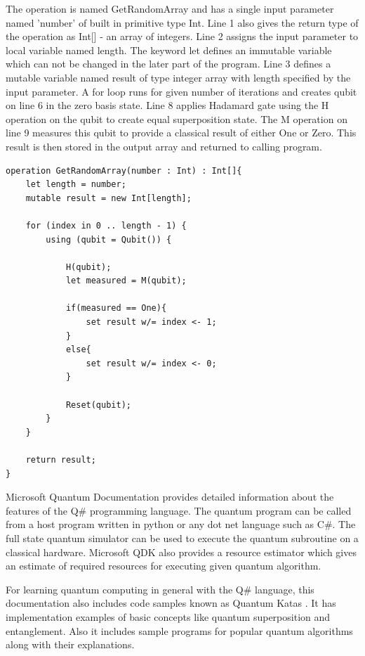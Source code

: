 \documentclass[english,a4paper,11pt,oneside,onecolumn]{book}
\begin{document}
The operation is named GetRandomArray and has a single input parameter named 'number' of built in primitive type Int.  Line 1 also gives the return type of the operation as Int[] - an array of integers. Line 2 assigns the input parameter to local variable named length. The keyword let defines an immutable variable which can not be changed in the later part of the program. Line 3 defines a mutable variable named result of type integer array with length specified by the input parameter. A for loop runs for given number of iterations and creates qubit on line 6 in the zero basis state. Line 8 applies Hadamard gate using the H operation on the qubit to create equal superposition state. The M operation on line 9 measures this qubit to provide a classical result of either One or Zero. This result is then stored in the output array and returned to calling program.

\begin{lstlisting}[caption={Example of Q\# Operation}]
operation GetRandomArray(number : Int) : Int[]{
    let length = number;
    mutable result = new Int[length];

    for (index in 0 .. length - 1) {
        using (qubit = Qubit()) {
            
            H(qubit);
            let measured = M(qubit);
            
            if(measured == One){
                set result w/= index <- 1;
            }
            else{
                set result w/= index <- 0;
            }

            Reset(qubit);
        }
    }
    
    return result;
}
\end{lstlisting}
\BlankLine

Microsoft Quantum Documentation provides detailed information about the features of the Q\# programming language. The quantum program can be called from a host program written in python or any dot net language such as C\#. The full state quantum simulator can be used to execute the quantum subroutine on a classical hardware. Microsoft QDK also provides a resource estimator which gives an estimate of required resources for executing given quantum algorithm.

For learning quantum computing in general with the Q\# language, this documentation also includes code samples known as Quantum Katas \cite{mykhailova_2020_microsoftquantumkatas}. It has implementation examples of basic concepts like quantum superposition and entanglement. Also it includes sample programs for popular quantum algorithms along with their explanations.
\end{document}
